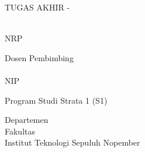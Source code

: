 \begin{large}
  TUGAS AKHIR - \coursecode{}
\end{large}

\vspace{\fill}

\begin{spacing}{1.5}
  \begin{Large}
    \tatitle{}
  \end{Large}
\end{spacing}

\vspace{\fill}

\begin{large}
  \name{} \\
  \textmd{NRP \nrp{}}
\end{large}

\vspace{\fill}

\begin{large}
  \textmd{Dosen Pembimbing} \\
  \advisor{} \\
  \textmd{NIP \advisornip{}} \\
\end{large}

\vspace{\fill}

Program Studi Strata 1 (S1) \studyprogram{} \\

\mdseries

Departemen \department{} \\
Fakultas \faculty{} \\
Institut Teknologi Sepuluh Nopember

\place{} \\ \the\year{}
